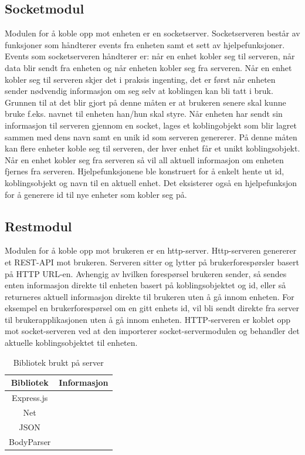 \documentclass[12pt]{report}
\begin{document}
\subsection{Socketmodul}
Modulen for å koble opp mot enheten er en socketserver. Socketserveren består av funksjoner som håndterer events fra enheten samt et sett av hjelpefunksjoner. Events som socketserveren håndterer er: når en enhet kobler seg til serveren, når data blir sendt fra enheten og når enheten kobler seg fra serveren. Når en enhet kobler seg til serveren skjer det i praksis ingenting, det er først når enheten sender nødvendig informasjon om seg selv at koblingen kan bli tatt i bruk. Grunnen til at det blir gjort på denne måten er at brukeren senere skal kunne bruke f.eks. navnet til enheten han/hun skal styre. Når enheten har sendt sin informasjon til serveren gjennom en socket, lages et koblingobjekt som blir lagret sammen med dens navn samt en unik id som serveren genererer. På denne måten kan flere enheter koble seg til serveren, der hver enhet får et unikt koblingsobjekt. Når en enhet kobler seg fra serveren så vil all aktuell informasjon om enheten fjernes fra serveren. Hjelpefunksjonene ble konstruert for å enkelt hente ut id, koblingsobjekt og navn til en aktuell enhet. Det eksisterer også en hjelpefunksjon for å generere id til nye enheter som kobler seg på. 

\subsection{Restmodul}
Modulen for å koble opp mot brukeren er en http-server. Http-serveren genererer et REST-API mot brukeren. Serveren sitter og lytter på brukerforespørsler basert på HTTP URL-en. Avhengig av hvilken forespørsel brukeren sender, så sendes enten informasjon direkte til enheten basert på koblingsobjektet og id, eller så returneres aktuell informasjon direkte til brukeren uten å gå innom enheten. For eksempel en brukerforespørsel om en gitt enhets id, vil bli sendt direkte fra server til brukerapplikasjonen uten å gå innom enheten. HTTP-serveren er koblet opp mot socket-serveren ved at	den importerer socket-servermodulen og behandler det aktuelle koblingsobjektet til enheten.


\begin{table}[H]
	\begin{tabular}{|c|c|}
		\hline 
		\textbf{Bibliotek }& \textbf{Informasjon} \\ 
		\hline 
		Express.js &   \\ 
		\hline 
		Net &  \\ 
		\hline 
		JSON &  	\\ 
		\hline 
		BodyParser &  	\\  
		\hline 
	\end{tabular} 
	\centering
	\caption{Bibliotek brukt på server}
	\label{serverBibliotek}
\end{table}
\end{document}
